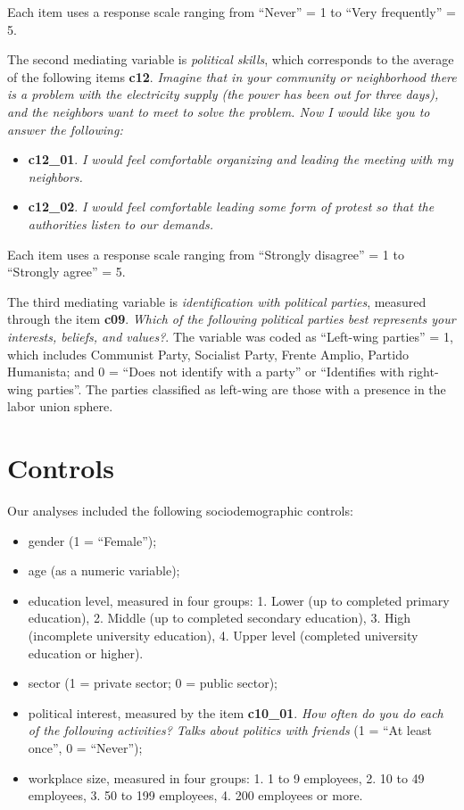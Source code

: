 \documentclass[
  letterpaper,
  DIV=11,
  numbers=noendperiod]{scrreprt}
\providecommand{\tightlist}{%
  \setlength{\itemsep}{0pt}\setlength{\parskip}{0pt}}\usepackage{longtable,booktabs,array}
\begin{document}
Each item uses a response scale ranging from ``Never'' = 1 to ``Very
frequently'' = 5.

The second mediating variable is \emph{political skills}, which
corresponds to the average of the following items \textbf{c12}.
\emph{Imagine that in your community or neighborhood there is a problem
with the electricity supply (the power has been out for three days), and
the neighbors want to meet to solve the problem. Now I would like you to
answer the following:}

\begin{itemize}
\tightlist
\item
  \textbf{c12\_01}. \emph{I would feel comfortable organizing and
  leading the meeting with my neighbors.}
\item
  \textbf{c12\_02}. \emph{I would feel comfortable leading some form of
  protest so that the authorities listen to our demands.}
\end{itemize}

Each item uses a response scale ranging from ``Strongly disagree'' = 1
to ``Strongly agree'' = 5.

The third mediating variable is \emph{identification with political
parties}, measured through the item \textbf{c09}. \emph{Which of the
following political parties best represents your interests, beliefs, and
values?}. The variable was coded as ``Left-wing parties'' = 1, which
includes Communist Party, Socialist Party, Frente Amplio, Partido
Humanista; and 0 = ``Does not identify with a party'' or ``Identifies
with right-wing parties''. The parties classified as left-wing are those
with a presence in the labor union sphere.

\hypertarget{controls}{%
\section{Controls}\label{controls}}

Our analyses included the following sociodemographic controls:

\begin{itemize}
\tightlist
\item
  gender (1 = ``Female'');
\item
  age (as a numeric variable);
\item
  education level, measured in four groups: 1. Lower (up to completed
  primary education), 2. Middle (up to completed secondary education),
  3. High (incomplete university education), 4. Upper level (completed
  university education or higher).
\item
  sector (1 = private sector; 0 = public sector);
\item
  political interest, measured by the item \textbf{c10\_01}. \emph{How
  often do you do each of the following activities? Talks about politics
  with friends} (1 = ``At least once'', 0 = ``Never'');
\item
  workplace size, measured in four groups: 1. 1 to 9 employees, 2. 10 to
  49 employees, 3. 50 to 199 employees, 4. 200 employees or more.
\end{itemize}
\end{document}

